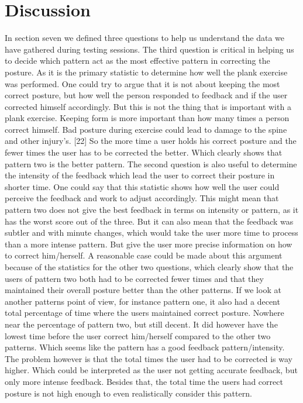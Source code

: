 \documentclass[sigconf]{acmart}
\begin{document}
\section{Discussion}
In section seven we defined three questions to help us understand the data we have gathered during testing sessions. The third question is critical in helping us to decide which pattern act as the most effective pattern in correcting the posture. As it is the primary statistic to determine how well the plank exercise was performed. One could try to argue that it is not about keeping the most correct posture, but how well the person responded to feedback and if the user corrected himself accordingly. But this is not the thing that is important with a plank exercise. Keeping form is more important than how many times a person correct himself. Bad posture during exercise could lead to damage to the spine and other injury's. [22] So the more time a user holds his correct posture and the fewer times the user has to be corrected the better. Which clearly shows that pattern two is the better pattern.
The second question is also useful to determine the intensity of the feedback which lead the user to correct their posture in shorter time. One could say that this statistic shows how well the user could perceive the feedback and work to adjust accordingly. This might mean that pattern two does not give the best feedback in terms on intensity or pattern, as it has the worst score out of the three. But it can also mean that the feedback was subtler and with minute changes, which would take the user more time to process than a more intense pattern. But give the user more precise information on how to correct him/herself. A reasonable case could be made about this argument because of the statistics for the other two questions, which clearly show that the users of pattern two both had to be corrected fewer times and that they maintained their overall posture better than the other patterns.
If we look at another patterns point of view, for instance pattern one, it also had a decent total percentage of time where the users maintained correct posture. Nowhere near the percentage of pattern two, but still decent. It did however have the lowest time before the user correct him/herself compared to the other two patterns. Which seems like the pattern has a good feedback pattern/intensity. The problem however is that the total times the user had to be corrected is way higher. Which could be interpreted as the user not getting accurate feedback, but only more intense feedback. Besides that, the total time the users had correct posture is not high enough to even realistically consider this pattern.
\end{document}
